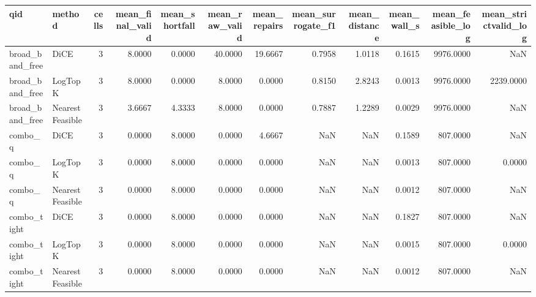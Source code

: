 \begin{tabular}{llrrrrrrrrrr}
\toprule
                 qid &          method &  cells &  mean\_final\_valid &  mean\_shortfall &  mean\_raw\_valid &  mean\_repairs &  mean\_surrogate\_f1 &  mean\_distance &  mean\_wall\_s &  mean\_feasible\_log &  mean\_strictvalid\_log \\
\midrule
     broad\_band\_free &            DiCE &      3 &            8.0000 &          0.0000 &         40.0000 &       19.6667 &             0.7958 &         1.0118 &       0.1615 &          9976.0000 &                   NaN \\
     broad\_band\_free &         LogTopK &      3 &            8.0000 &          0.0000 &          8.0000 &        0.0000 &             0.8150 &         2.8243 &       0.0013 &          9976.0000 &             2239.0000 \\
     broad\_band\_free & NearestFeasible &      3 &            3.6667 &          4.3333 &          8.0000 &        0.0000 &             0.7887 &         1.2289 &       0.0029 &          9976.0000 &                   NaN \\
             combo\_q &            DiCE &      3 &            0.0000 &          8.0000 &          0.0000 &        4.6667 &                NaN &            NaN &       0.1589 &           807.0000 &                   NaN \\
             combo\_q &         LogTopK &      3 &            0.0000 &          8.0000 &          0.0000 &        0.0000 &                NaN &            NaN &       0.0013 &           807.0000 &                0.0000 \\
             combo\_q & NearestFeasible &      3 &            0.0000 &          8.0000 &          0.0000 &        0.0000 &                NaN &            NaN &       0.0012 &           807.0000 &                   NaN \\
         combo\_tight &            DiCE &      3 &            0.0000 &          8.0000 &          0.0000 &        0.0000 &                NaN &            NaN &       0.1827 &           807.0000 &                   NaN \\
         combo\_tight &         LogTopK &      3 &            0.0000 &          8.0000 &          0.0000 &        0.0000 &                NaN &            NaN &       0.0015 &           807.0000 &                0.0000 \\
         combo\_tight & NearestFeasible &      3 &            0.0000 &          8.0000 &          0.0000 &        0.0000 &                NaN &            NaN &       0.0012 &           807.0000 &                   NaN \\

\end{tabular}
